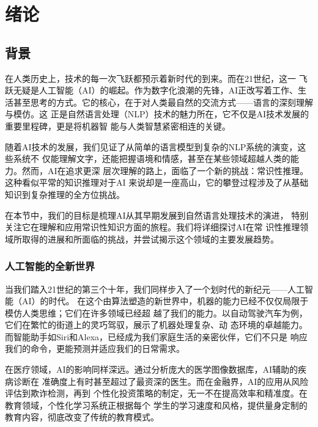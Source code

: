\section{绪论}
\subsection{背景}
\label{sec:background}

在人类历史上，技术的每一次飞跃都预示着新时代的到来。而在21世纪，这一
飞跃无疑是人工智能（AI）的崛起。作为数字化浪潮的先锋，AI正改写着工作、生
活甚至思考的方式。它的核心，在于对人类最自然的交流方式——语言的深刻理解与模仿。这
正是自然语言处理（NLP）技术的魅力所在，它不仅是AI技术发展的重要里程碑，更是将机器智
能与人类智慧紧密相连的关键。

随着AI技术的发展，我们见证了从简单的语言模型到复杂的NLP系统的演变，这些系统不
仅能理解文字，还能把握语境和情感，甚至在某些领域超越人类的能力。然而，AI在追求更深
层次理解的路上，面临了一个新的挑战：常识性推理。这种看似平常的知识推理对于AI
来说却是一座高山，它的攀登过程涉及了从基础知识到复杂推理的全方位挑战。

在本节中，我们的目标是梳理AI从其早期发展到自然语言处理技术的演进，
特别关注它在理解和应用常识性知识方面的旅程。我们将详细探讨AI在常
识性推理领域所取得的进展和所面临的挑战，并尝试揭示这个领域的主要发展趋势。

\subsubsection{人工智能的全新世界}

当我们踏入21世纪的第三个十年，我们同样步入了一个划时代的新纪元——人工智能（AI）的时代。
在这个由算法塑造的新世界中，机器的能力已经不仅仅局限于模仿人类思维；它们在许多领域已经超
越了我们的能力。以自动驾驶汽车为例，它们在繁忙的街道上的灵巧驾驭，展示了机器处理复杂、动
态环境的卓越能力。而智能助手如Siri和Alexa，已经成为我们家庭生活的亲密伙伴，它们不只是
响应我们的命令，更能预测并适应我们的日常需求。

在医疗领域，AI的影响同样深远。通过分析庞大的医学图像数据库，AI辅助的疾病诊断在
准确度上有时甚至超过了最资深的医生。而在金融界，AI的应用从风险评估到欺诈检测，再到
个性化投资策略的制定，无一不在提高效率和精准度。在教育领域，个性化学习系统正根据每个
学生的学习速度和风格，提供量身定制的教育内容，彻底改变了传统的教育模式。

